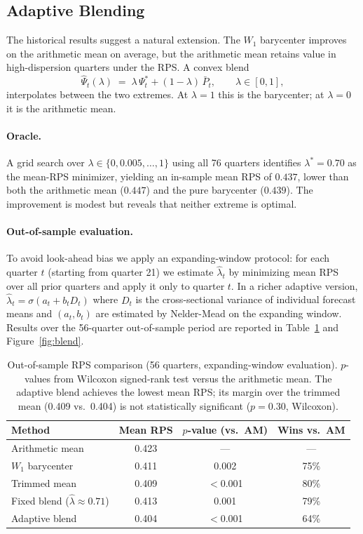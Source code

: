 \subsection{Adaptive Blending}
\label{sec:blend}

The historical results suggest a natural extension.  The $W_1$ barycenter improves on the arithmetic mean on average, but the arithmetic mean retains value in high-dispersion quarters under the RPS.  A convex blend
\[
  \hat{\Psi}_t(\lambda) \;=\; \lambda\,\Psi^*_t + (1-\lambda)\,\bar{P}_t,\qquad \lambda\in[0,1],
\]
interpolates between the two extremes.  At $\lambda=1$ this is the barycenter; at $\lambda=0$ it is the arithmetic mean.

\paragraph{Oracle.}  A grid search over $\lambda\in\{0,0.005,\ldots,1\}$ using all 76 quarters identifies $\lambda^*=0.70$ as the mean-RPS minimizer, yielding an in-sample mean RPS of $0.437$, lower than both the arithmetic mean ($0.447$) and the pure barycenter ($0.439$).  The improvement is modest but reveals that neither extreme is optimal.

\paragraph{Out-of-sample evaluation.}  To avoid look-ahead bias we apply an expanding-window protocol: for each quarter $t$ (starting from quarter 21) we estimate $\hat\lambda_t$ by minimizing mean RPS over all prior quarters and apply it only to quarter $t$.  In a richer adaptive version, $\hat\lambda_t = \sigma(a_t + b_t D_t)$ where $D_t$ is the cross-sectional variance of individual forecast means and $(a_t, b_t)$ are estimated by Nelder-Mead on the expanding window.  Results over the 56-quarter out-of-sample period are reported in Table~\ref{tab:blend} and Figure~\ref{fig:blend}.

\begin{table}[ht]
\centering
\small
\begin{tabular}{lccc}
\hline
Method & Mean RPS & $p$-value (vs.\ AM) & Wins vs.\ AM \\
\hline
Arithmetic mean        & 0.423 & ---       & ---   \\
$W_1$ barycenter       & 0.411 & 0.002     & 75\%  \\
Trimmed mean           & 0.409 & $<$0.001  & 80\%  \\
Fixed blend ($\hat\lambda\approx0.71$) & 0.413 & 0.001 & 79\% \\
Adaptive blend         & 0.404 & $<$0.001  & 64\%  \\
\hline
\end{tabular}
\caption{Out-of-sample RPS comparison (56 quarters, expanding-window evaluation).  $p$-values from Wilcoxon signed-rank test versus the arithmetic mean.  The adaptive blend achieves the lowest mean RPS; its margin over the trimmed mean (0.409 vs.\ 0.404) is not statistically significant ($p=0.30$, Wilcoxon).}
\label{tab:blend}
\end{table}

